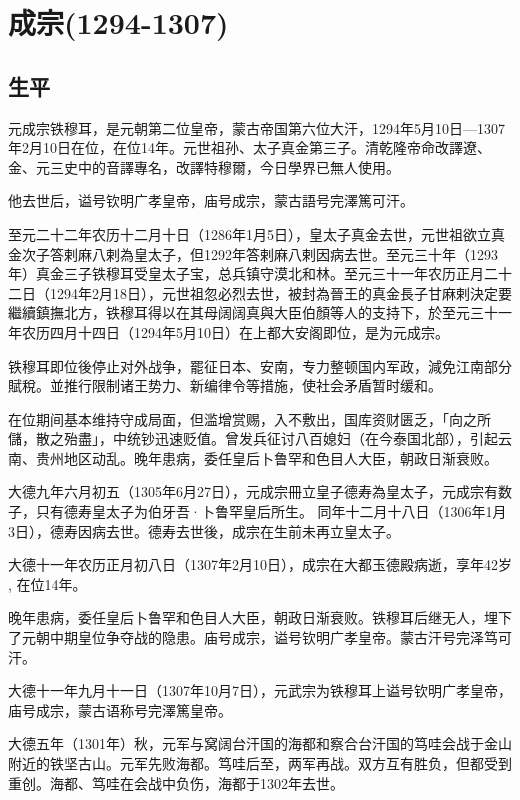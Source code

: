 
\section{成宗\tiny(1294-1307)}

\subsection{生平}

元成宗铁穆耳，是元朝第二位皇帝，蒙古帝国第六位大汗，1294年5月10日—1307年2月10日在位，在位14年。元世祖孙、太子真金第三子。清乾隆帝命改譯遼、金、元三史中的音譯專名，改譯特穆爾，今日學界已無人使用。

他去世后，谥号钦明广孝皇帝，庙号成宗，蒙古語号完澤篤可汗。

至元二十二年农历十二月十日（1286年1月5日），皇太子真金去世，元世祖欲立真金次子答剌麻八剌為皇太子，但1292年答剌麻八剌因病去世。至元三十年（1293年）真金三子铁穆耳受皇太子宝，总兵镇守漠北和林。至元三十一年农历正月二十二日（1294年2月18日），元世祖忽必烈去世，被封為晉王的真金長子甘麻剌決定要繼續鎮撫北方，铁穆耳得以在其母阔阔真與大臣伯顏等人的支持下，於至元三十一年农历四月十四日（1294年5月10日）在上都大安阁即位，是为元成宗。

铁穆耳即位後停止对外战争，罷征日本、安南，专力整顿国内军政，減免江南部分賦稅。並推行限制诸王势力、新编律令等措施，使社会矛盾暂时缓和。

在位期间基本维持守成局面，但滥增赏赐，入不敷出，国库资财匮乏，「向之所儲，散之殆盡」，中统钞迅速贬值。曾发兵征讨八百媳妇（在今泰国北部），引起云南、贵州地区动乱。晚年患病，委任皇后卜鲁罕和色目人大臣，朝政日渐衰败。

大德九年六月初五（1305年6月27日），元成宗冊立皇子德寿為皇太子，元成宗有数子，只有德寿皇太子为伯牙吾·卜鲁罕皇后所生。 同年十二月十八日（1306年1月3日），德寿因病去世。德寿去世後，成宗在生前未再立皇太子。

大德十一年农历正月初八日（1307年2月10日），成宗在大都玉德殿病逝，享年42岁 , 在位14年。

晚年患病，委任皇后卜鲁罕和色目人大臣，朝政日渐衰败。铁穆耳后继无人，埋下了元朝中期皇位争夺战的隐患。庙号成宗，谥号钦明广孝皇帝。蒙古汗号完泽笃可汗。

大德十一年九月十一日（1307年10月7日），元武宗为铁穆耳上谥号钦明广孝皇帝，庙号成宗，蒙古语称号完澤篤皇帝。

大德五年（1301年）秋，元军与窝阔台汗国的海都和察合台汗国的笃哇会战于金山附近的铁坚古山。元军先败海都。笃哇后至，两军再战。双方互有胜负，但都受到重创。海都、笃哇在会战中负伤，海都于1302年去世。

